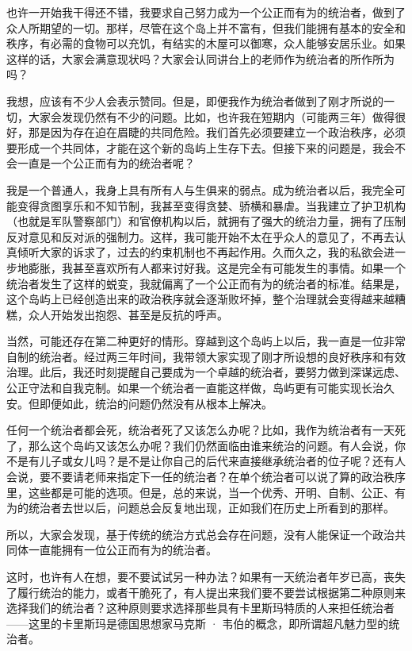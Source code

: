 也许一开始我干得还不错，我要求自己努力成为一个公正而有为的统治者，做到了众人所期望的一切。那样，尽管在这个岛上并不富有，但我们能拥有基本的安全和秩序，有必需的食物可以充饥，有结实的木屋可以御寒，众人能够安居乐业。如果这样的话，大家会满意现状吗？大家会认同讲台上的老师作为统治者的所作所为吗？

我想，应该有不少人会表示赞同。但是，即便我作为统治者做到了刚才所说的一切，大家会发现仍然有不少的问题。比如，也许我在短期内（可能两三年）做得很好，那是因为存在迫在眉睫的共同危险。我们首先必须要建立一个政治秩序，必须要形成一个共同体，才能在这个新的岛屿上生存下去。但接下来的问题是，我会不会一直是一个公正而有为的统治者呢？

我是一个普通人，我身上具有所有人与生俱来的弱点。成为统治者以后，我完全可能变得贪图享乐和不知节制，我甚至变得贪婪、骄横和暴虐。当我建立了护卫机构（也就是军队警察部门）和官僚机构以后，就拥有了强大的统治力量，拥有了压制反对意见和反对派的强制力。这样，我可能开始不太在乎众人的意见了，不再去认真倾听大家的诉求了，过去的约束机制也不再起作用。久而久之，我的私欲会进一步地膨胀，我甚至喜欢所有人都来讨好我。这是完全有可能发生的事情。如果一个统治者发生了这样的蜕变，我就偏离了一个公正而有为的统治者的标准。结果是，这个岛屿上已经创造出来的政治秩序就会逐渐败坏掉，整个治理就会变得越来越糟糕，众人开始发出抱怨、甚至是反抗的呼声。

当然，可能还存在第二种更好的情形。穿越到这个岛屿上以后，我一直是一位非常自制的统治者。经过两三年时间，我带领大家实现了刚才所设想的良好秩序和有效治理。此后，我还时刻提醒自己要成为一个卓越的统治者，要努力做到深谋远虑、公正守法和自我克制。如果一个统治者一直能这样做，岛屿更有可能实现长治久安。但即便如此，统治的问题仍然没有从根本上解决。

任何一个统治者都会死，统治者死了又该怎么办呢？比如，我作为统治者有一天死了，那么这个岛屿又该怎么办呢？我们仍然面临由谁来统治的问题。有人会说，你不是有儿子或女儿吗？是不是让你自己的后代来直接继承统治者的位子呢？还有人会说，要不要请老师来指定下一任的统治者？在单个统治者可以说了算的政治秩序里，这些都是可能的选项。但是，总的来说，当一个优秀、开明、自制、公正、有为的统治者去世以后，问题总会反复地出现，正如我们在历史上所看到的那样。

所以，大家会发现，基于传统的统治方式总会存在问题，没有人能保证一个政治共同体一直能拥有一位公正而有为的统治者。

这时，也许有人在想，要不要试试另一种办法？如果有一天统治者年岁已高，丧失了履行统治的能力，或者干脆死了，有人提出来我们要不要尝试根据第二种原则来选择我们的统治者？这种原则要求选择那些具有卡里斯玛特质的人来担任统治者——这里的卡里斯玛是德国思想家马克斯 · 韦伯的概念，即所谓超凡魅力型的统治者。

